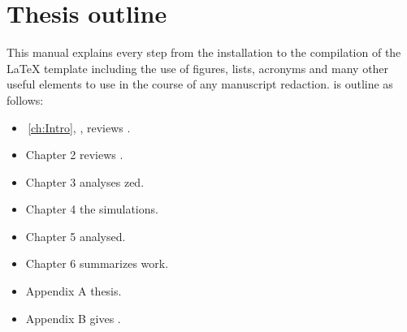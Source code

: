 \section{Thesis outline} %
This manual explains every step from the installation to the compilation of the \LaTeX{} template including the use of figures, lists, acronyms and many other useful elements to use in the course of any manuscript redaction. \ThesiX{} is outline as follows:
\begin{itemize}
	\item \cha\,\ref{ch:Intro}, \textit{}, reviews .
	\item Chapter 2 reviews .
	\item Chapter 3 analyses zed.
	\item Chapter 4  the simulations.
	\item Chapter 5 analysed.
	\item Chapter 6 summarizes work.
	\item Appendix A thesis.
	\item Appendix B gives .  
\end{itemize}